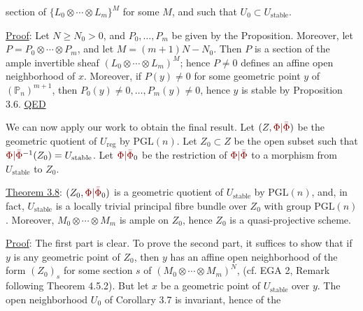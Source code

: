 
section of $\{L_0\otimes\cdots\otimes L_m\}^M$ for some $M$, and such that $U_0\subset U_{\mathrm{stable}}$.

\uline{Proof}: Let $N\geq N_0>0$, and $P_0,\ldots,P_m$ be given by the Proposition. Moreover, let $P=P_0\otimes\cdots\otimes P_m$, and let $M=(m+1)N-N_0$. Then $P$ is a section of the ample invertible sheaf $(L_0\otimes\cdots\otimes L_m)^M$; hence $P\ne0$ defines an affine open neighborhood of $x$. Moreover, if $P(y)\ne0$ for some geometric point $y$ of $(\mathbb{P}_n)^{m+1}$, then $P_0(y)\ne0,\ldots,P_m(y)\ne0$, hence $y$ is stable by Proposition 3.6.
\uline{QED}

We can now apply our work to obtain the final result. Let $(Z,\unsure{\Phi|\bar\Phi})$ be the geometric quotient of $U_{\mathrm{reg}}$ by $\mathrm{PGL}(n)$. Let $Z_0\subset Z$ be the open subset such that $\unsure{\Phi|\bar\Phi}^{-1}(Z_0)=U_{\mathrm{stable}}$. Let $\unsure{\Phi|\bar\Phi}_0$ be the restriction of $\unsure{\Phi|\bar\Phi}$ to a morphism from $U_{\mathrm{stable}}$ to $Z_0$.

\uline{Theorem 3.8}: $(Z_0,\unsure{\Phi|\bar\Phi}_0)$ is a geometric quotient of $U_{\mathrm{stable}}$ by $\mathrm{PGL}(n)$, and, in fact, $U_{\mathrm{stable}}$ is a locally trivial principal fibre bundle over $Z_0$ with group $\mathrm{PGL}(n)$. Moreover, $M_0\otimes\cdots\otimes M_m$ is ample on $Z_0$, hence $Z_0$ is a quasi-projective scheme.

\uline{Proof}: The first part is clear. To prove the second part, it suffices to show that if $y$ is any geometric point of $Z_0$, then $y$ has an affine open neighborhood of the form $(Z_0)_s$ for some section $s$ of $(M_0\otimes\cdots\otimes M_m)^N$, (cf. EGA 2, Remark following Theorem 4.5.2). But let $x$ be a geometric point of $U_{\mathrm{stable}}$ over $y$. The open neighborhood $U_0$ of Corollary 3.7 is invariant, hence of the
